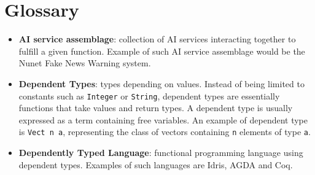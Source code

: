 \documentclass[]{report}
\begin{document}
\chapter{Glossary}
\begin{itemize}
\item \textbf{AI service assemblage}: collection of AI services
  interacting together to fulfill a given function.  Example of such
  AI service assemblage would be the Nunet Fake News Warning system.
\item \textbf{Dependent Types}: types depending on values.  Instead of
  being limited to constants such as \texttt{Integer} or
  \texttt{String}, dependent types are essentially functions that take
  values and return types.  A dependent type is usually expressed as a
  term containing free variables.  An example of dependent type is
  \texttt{Vect n a}, representing the class of vectors containing
  \texttt{n} elements of type \texttt{a}.
\item \textbf{Dependently Typed Language}: functional programming
  language using dependent types.  Examples of such languages are
  Idris, AGDA and Coq.
\end{itemize}



\end{document}
